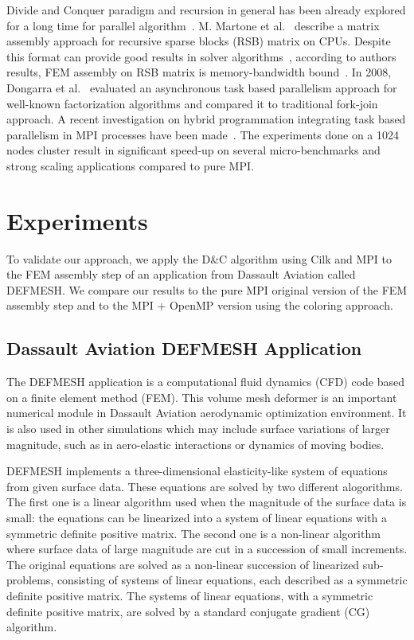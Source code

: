 \documentclass{IOS-Book-Article}
\begin{document}
Divide and Conquer paradigm and recursion in general has been already explored for a long time for parallel algorithm~\cite{div}.
M. Martone et al.~\cite{RSBasm} describe a matrix assembly approach for recursive sparse blocks (RSB) matrix on CPUs.
Despite this format can provide good results in solver algorithms~\cite{RSBsolver}, according to authors results, FEM assembly on RSB matrix is memory-bandwidth bound~\cite{RSBasm}.
In 2008, Dongarra et al.~\cite{Dongarra} evaluated an asynchronous task based parallelism approach for well-known factorization algorithms and compared it to traditional fork-join approach.
A recent investigation on hybrid programmation integrating task based parallelism in MPI processes have been made~\cite{MPIhybid}.
The experiments done on a 1024 nodes cluster result in significant speed-up on several micro-benchmarks and strong scaling applications compared to pure MPI.

\section{Experiments}
To validate our approach, we apply the D\&C algorithm using Cilk and MPI to the FEM assembly step of an application from Dassault Aviation called DEFMESH.
We compare our results to the pure MPI original version of the FEM assembly step and to the MPI + OpenMP version using the coloring approach.

\subsection{Dassault Aviation DEFMESH Application}
The DEFMESH application is a computational fluid dynamics (CFD) code based on a finite element method (FEM).
This volume mesh deformer is an important numerical module in Dassault Aviation aerodynamic optimization environment.
It is also used in other simulations which may include surface variations of larger magnitude, such as in aero-elastic interactions or dynamics of moving bodies.

DEFMESH implements a three-dimensional elasticity-like system of equations from given surface data.
These equations are solved by two different alogorithms.
The first one is a linear algorithm used when the magnitude of the surface data is small: the equations can be linearized into a system of linear equations with a symmetric definite positive matrix.
The second one is a non-linear algorithm where surface data of large magnitude are cut in a succession of small increments.
The original equations are solved as a non-linear succession of linearized sub-problems, consisting of systems of linear equations, each described as a symmetric definite positive matrix.
The systems of linear equations, with a symmetric definite positive matrix, are solved by a standard conjugate gradient (CG) algorithm.
\end{document}
